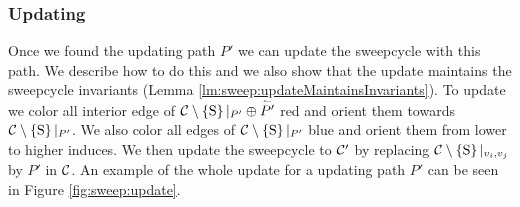 \subsubsection{Updating}
  \label{sss:sweep:update}
  Once we found the updating path $P'$ we can update the sweepcycle with this path.
  We describe how to do this and we also show that the update maintains the sweepcycle invariants (Lemma \ref{lm:sweep:updateMaintainsInvariants}).
  To update we color all interior edge of $\mathcal{C} \setminus \left\lbrace {\mathrm{S}} \right\rbrace|_{P'} \oplus \accentset{\leftharpoonup}{P'}$ red and orient them towards $\mathcal{C} \setminus \left\lbrace {\mathrm{S}} \right\rbrace|_{P'}$.
  We also color all edges of $\mathcal{C} \setminus \left\lbrace {\mathrm{S}} \right\rbrace|_{P'}$  blue and orient them from lower to higher induces.
  We then update the sweepcycle to $\mathcal{C}'$ by replacing $\mathcal{C} \setminus \left\lbrace {\mathrm{S}} \right\rbrace|_{v_i,v_j}$ by $P'$ in $\mathcal{C}$.
  An example of the whole update for a updating path $P'$ can be seen in Figure \ref{fig:sweep:update}.

